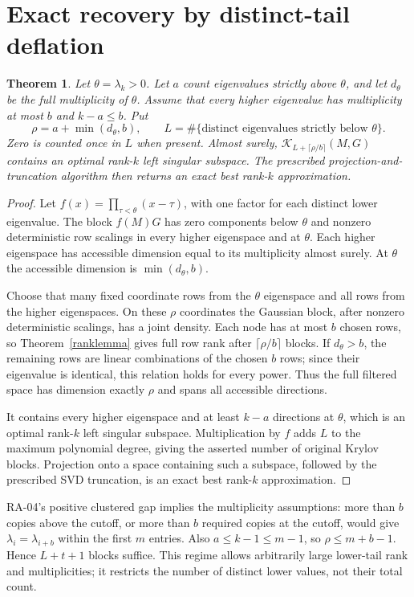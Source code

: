\documentclass[11pt]{article}
\newtheorem{theorem}{Theorem}[section]
\newcommand{\K}{\mathcal K}
\begin{document}
\section{Exact recovery by distinct-tail deflation}
\begin{theorem}\label{exact}
Let $\theta=\lambda_k>0$. Let $a$ count eigenvalues strictly above $\theta$,
and let $d_\theta$ be the full multiplicity of $\theta$. Assume that every
higher eigenvalue has multiplicity at most $b$ and $k-a\le b$. Put
\[
 \rho=a+\min(d_\theta,b),\qquad
 L=\#\{\text{distinct eigenvalues strictly below }\theta\}.
\]
Zero is counted once in $L$ when present. Almost surely,
$\K_{L+\lceil\rho/b\rceil}(M,G)$ contains an optimal rank-$k$ left singular
subspace. The prescribed projection-and-truncation algorithm then returns
an exact best rank-$k$ approximation.
\end{theorem}
\begin{proof}
Let $f(x)=\prod_{\tau<\theta}(x-\tau)$, with one factor for each distinct
lower eigenvalue. The block $f(M)G$ has zero components below $\theta$ and
nonzero deterministic row scalings in every higher eigenspace and at $\theta$.
Each higher eigenspace has accessible dimension equal to its multiplicity
almost surely. At $\theta$ the accessible dimension is $\min(d_\theta,b)$.

Choose that many fixed coordinate rows from the $\theta$ eigenspace and
all rows from the higher eigenspaces. On these $\rho$ coordinates the Gaussian
block, after nonzero deterministic scalings, has a joint density. Each node
has at most $b$ chosen rows, so Theorem~\ref{ranklemma} gives full row rank
after $\lceil\rho/b\rceil$ blocks. If $d_\theta>b$, the remaining rows
are linear combinations of the chosen $b$ rows; since their eigenvalue is
identical, this relation holds for every power. Thus the full filtered space
has dimension exactly $\rho$ and spans all accessible directions.

It contains every higher eigenspace and at least $k-a$ directions at $\theta$,
which is an optimal rank-$k$ left singular subspace. Multiplication by $f$
adds $L$ to the maximum polynomial degree, giving the asserted number of
original Krylov blocks. Projection onto a space containing such a subspace,
followed by the prescribed SVD truncation, is an exact best rank-$k$
approximation.
\end{proof}
RA-04's positive clustered gap implies the multiplicity assumptions: more
than $b$ copies above the cutoff, or more than $b$ required copies at the
cutoff, would give $\lambda_i=\lambda_{i+b}$ within the first $m$ entries.
Also $a\le k-1\le m-1$, so $\rho\le m+b-1$. Hence $L+t+1$ blocks suffice.
This regime allows arbitrarily large lower-tail rank and multiplicities;
it restricts the number of distinct lower values, not their total count.
\end{document}
